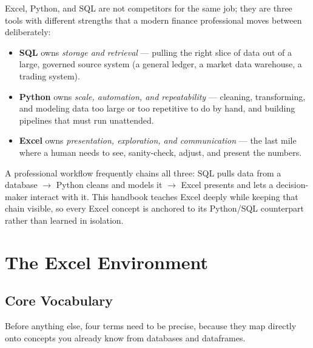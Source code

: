 \documentclass[11pt,a4paper]{article}
\begin{document}
\begin{keyconcept}
Excel, Python, and SQL are not competitors for the same job; they are three tools with different strengths that a modern finance professional moves between deliberately:
\begin{itemize}
  \item \textbf{SQL} owns \emph{storage and retrieval} --- pulling the right slice of data out of a large, governed source system (a general ledger, a market data warehouse, a trading system).
  \item \textbf{Python} owns \emph{scale, automation, and repeatability} --- cleaning, transforming, and modeling data too large or too repetitive to do by hand, and building pipelines that must run unattended.
  \item \textbf{Excel} owns \emph{presentation, exploration, and communication} --- the last mile where a human needs to see, sanity-check, adjust, and present the numbers.
\end{itemize}
A professional workflow frequently chains all three: SQL pulls data from a database $\rightarrow$ Python cleans and models it $\rightarrow$ Excel presents and lets a decision-maker interact with it. This handbook teaches Excel deeply while keeping that chain visible, so every Excel concept is anchored to its Python/SQL counterpart rather than learned in isolation.
\end{keyconcept}

\section{The Excel Environment}

\subsection{Core Vocabulary}

Before anything else, four terms need to be precise, because they map directly onto concepts you already know from databases and dataframes.
\end{document}
